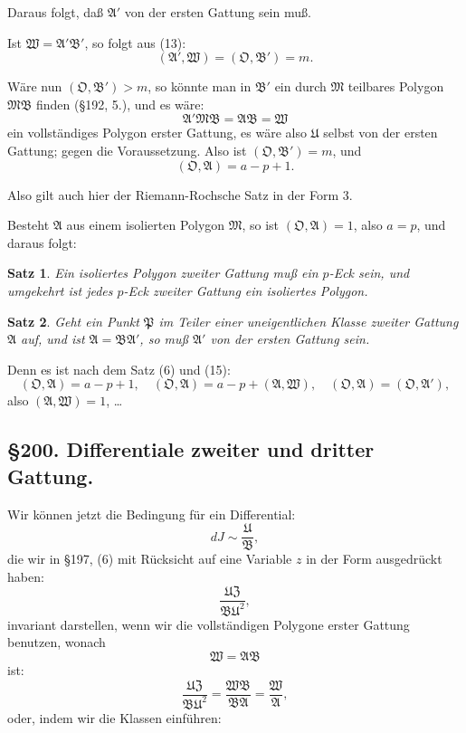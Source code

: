 \documentclass[12pt,a4paper]{article}
\newtheorem*{satz}{Satz}
\begin{document}
Daraus folgt, daß $\mathfrak{A}'$ von der ersten Gattung sein muß.

Ist $\mathfrak{W} = \mathfrak{A}'\mathfrak{B}'$, so folgt aus (13):
\begin{equation}\label{eq:199-14}
(\mathfrak{A}', \mathfrak{W}) = (\mathfrak{O}, \mathfrak{B}') = m.
\end{equation}

Wäre nun $(\mathfrak{O}, \mathfrak{B}') > m$, so könnte man in $\mathfrak{B}'$ ein durch $\mathfrak{M}$ teilbares Polygon $\mathfrak{M}\mathfrak{B}$ finden (\S 192, 5.), und es wäre:
\[
\mathfrak{A}'\mathfrak{M}\mathfrak{B} = \mathfrak{A}\mathfrak{B} = \mathfrak{W}
\]
ein vollständiges Polygon erster Gattung, es wäre also $\mathfrak{U}$ selbst von der ersten Gattung; gegen die Voraussetzung. Also ist $(\mathfrak{O}, \mathfrak{B}') = m$, und
\begin{equation}\label{eq:199-15}
(\mathfrak{O}, \mathfrak{A}) = a - p + 1.
\end{equation}

Also gilt auch hier der Riemann-Rochsche Satz in der Form 3.

Besteht $\mathfrak{A}$ aus einem isolierten Polygon $\mathfrak{M}$, so ist $(\mathfrak{O}, \mathfrak{A}) = 1$, also $a = p$, und daraus folgt:

\begin{satz}
Ein isoliertes Polygon zweiter Gattung muß ein $p$-Eck sein, und umgekehrt ist jedes $p$-Eck zweiter Gattung ein isoliertes Polygon.
\end{satz}

\begin{satz}
Geht ein Punkt $\mathfrak{P}$ im Teiler einer uneigentlichen Klasse zweiter Gattung $\mathfrak{A}$ auf, und ist $\mathfrak{A} = \mathfrak{B}\mathfrak{A}'$, so muß $\mathfrak{A}'$ von der ersten Gattung sein.
\end{satz}

Denn es ist nach dem Satz (6) und (15):
\[
(\mathfrak{O}, \mathfrak{A}) = a - p + 1, \quad (\mathfrak{O}, \mathfrak{A}) = a - p + (\mathfrak{A}, \mathfrak{W}), \quad (\mathfrak{O}, \mathfrak{A}) = (\mathfrak{O}, \mathfrak{A}'),
\]
also $(\mathfrak{A}, \mathfrak{W}) = 1$, \ldots

\subsection*{\S 200. Differentiale zweiter und dritter Gattung.}

Wir können jetzt die Bedingung für ein Differential:
\begin{equation}\label{eq:200-1}
dJ \sim \frac{\mathfrak{U}}{\mathfrak{B}},
\end{equation}
die wir in \S 197, (6) mit Rücksicht auf eine Variable $z$ in der Form ausgedrückt haben:
\[
\frac{\mathfrak{U}\mathfrak{Z}}{\mathfrak{B}\mathfrak{U}^2},
\]
invariant darstellen, wenn wir die vollständigen Polygone erster Gattung benutzen, wonach
\[
\mathfrak{W} = \mathfrak{A}\mathfrak{B}
\]
ist:
\[
\frac{\mathfrak{U}\mathfrak{Z}}{\mathfrak{B}\mathfrak{U}^2} = \frac{\mathfrak{W}\mathfrak{B}}{\mathfrak{B}\mathfrak{A}} = \frac{\mathfrak{W}}{\mathfrak{A}},
\]
oder, indem wir die Klassen einführen:
\end{document}

